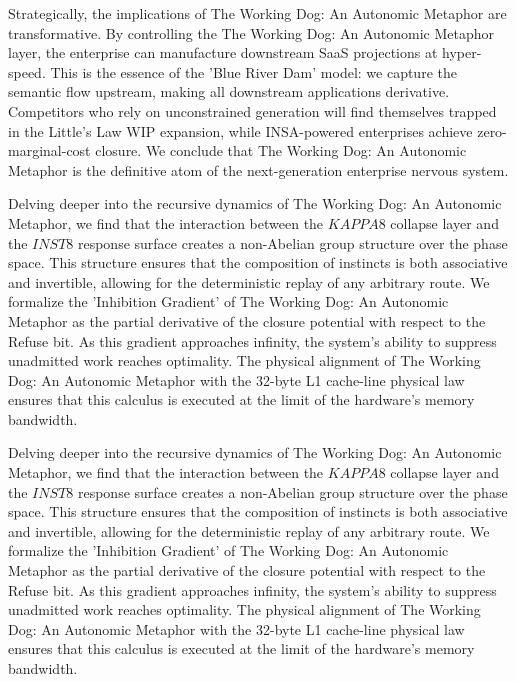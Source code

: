 \documentclass[12pt,a4paper,oneside]{book}
\begin{document}
Strategically, the implications of The Working Dog: An Autonomic Metaphor are transformative. By controlling the The Working Dog: An Autonomic Metaphor layer, the enterprise can manufacture downstream SaaS projections at hyper-speed. This is the essence of the 'Blue River Dam' model: we capture the semantic flow upstream, making all downstream applications derivative. Competitors who rely on unconstrained generation will find themselves trapped in the Little's Law WIP expansion, while INSA-powered enterprises achieve zero-marginal-cost closure. We conclude that The Working Dog: An Autonomic Metaphor is the definitive atom of the next-generation enterprise nervous system. 

Delving deeper into the recursive dynamics of The Working Dog: An Autonomic Metaphor, we find that the interaction between the $KAPPA8$ collapse layer and the $INST8$ response surface creates a non-Abelian group structure over the phase space. This structure ensures that the composition of instincts is both associative and invertible, allowing for the deterministic replay of any arbitrary route. We formalize the 'Inhibition Gradient' of The Working Dog: An Autonomic Metaphor as the partial derivative of the closure potential with respect to the Refuse bit. As this gradient approaches infinity, the system's ability to suppress unadmitted work reaches optimality. The physical alignment of The Working Dog: An Autonomic Metaphor with the 32-byte L1 cache-line physical law ensures that this calculus is executed at the limit of the hardware's memory bandwidth. 

Delving deeper into the recursive dynamics of The Working Dog: An Autonomic Metaphor, we find that the interaction between the $KAPPA8$ collapse layer and the $INST8$ response surface creates a non-Abelian group structure over the phase space. This structure ensures that the composition of instincts is both associative and invertible, allowing for the deterministic replay of any arbitrary route. We formalize the 'Inhibition Gradient' of The Working Dog: An Autonomic Metaphor as the partial derivative of the closure potential with respect to the Refuse bit. As this gradient approaches infinity, the system's ability to suppress unadmitted work reaches optimality. The physical alignment of The Working Dog: An Autonomic Metaphor with the 32-byte L1 cache-line physical law ensures that this calculus is executed at the limit of the hardware's memory bandwidth. 
\end{document}
